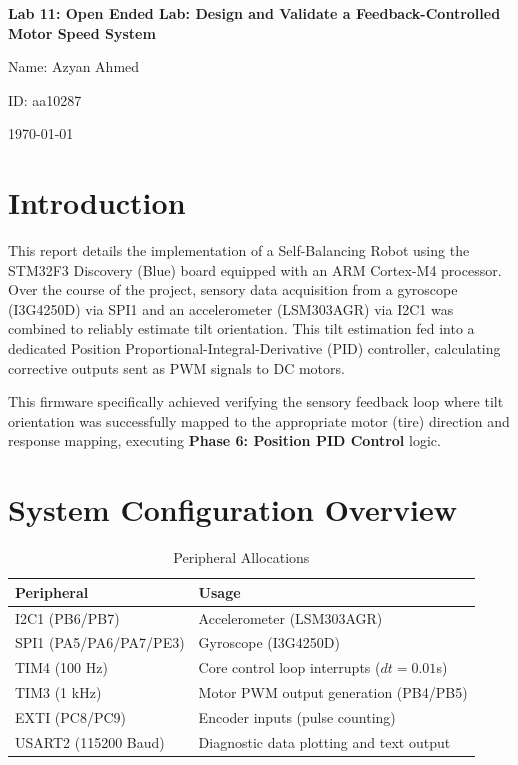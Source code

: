 \documentclass[12pt,a4paper]{article}
\begin{document}
\begin{titlepage}
    \centering
    \vspace*{2cm}
    {\LARGE \textbf{Lab 11: Open Ended Lab: Design and Validate a Feedback-Controlled Motor Speed System}}\par
    \vspace{1.5cm}
    {\large Name: Azyan Ahmed}\par
    \vspace{0.5cm}
    {\large ID: aa10287}\par
    \vspace{0.5cm}
    {\large \today}\par
    \vfill
\end{titlepage}

\section{Introduction}

This report details the implementation of a Self-Balancing Robot using the STM32F3 Discovery (Blue) board equipped with an ARM Cortex-M4 processor. Over the course of the project, sensory data acquisition from a gyroscope (I3G4250D) via SPI1 and an accelerometer (LSM303AGR) via I2C1 was combined to reliably estimate tilt orientation. This tilt estimation fed into a dedicated Position Proportional-Integral-Derivative (PID) controller, calculating corrective outputs sent as PWM signals to DC motors.

This firmware specifically achieved verifying the sensory feedback loop where tilt orientation was successfully mapped to the appropriate motor (tire) direction and response mapping, executing \textbf{Phase 6: Position PID Control} logic.

\section{System Configuration Overview}

\begin{table}[H]
\centering
\begin{tabular}{ll}
\toprule
\textbf{Peripheral} & \textbf{Usage} \\
\midrule
I2C1 (PB6/PB7) & Accelerometer (LSM303AGR) \\
SPI1 (PA5/PA6/PA7/PE3) & Gyroscope (I3G4250D) \\
TIM4 (100 Hz) & Core control loop interrupts ($dt = 0.01$s) \\
TIM3 (1 kHz) & Motor PWM output generation (PB4/PB5) \\
EXTI (PC8/PC9) & Encoder inputs (pulse counting) \\
USART2 (115200 Baud) & Diagnostic data plotting and text output \\
\bottomrule
\end{tabular}
\caption{Peripheral Allocations}
\end{table}
\end{document}
